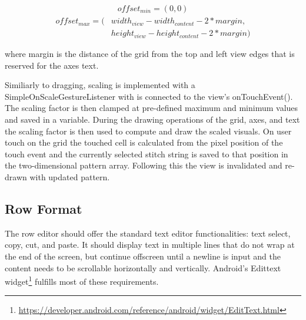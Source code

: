 \begin{gather*}
offset_{min} = (0, 0)
\end{gather*}
\begin{align*}
offset_{max} = (&width_{view} - width_{content} - 2 * margin, \\
				&height_{view} - height_{content} - 2 * margin)
\end{align*}

where margin is the distance of the grid from the top and left view edges that is reserved for the axes text.

Similiarly to dragging, scaling is implemented with a SimpleOnScaleGestureListener with is connected to the view's onTouchEvent(). The scaling factor is then clamped at pre-defined maximum and minimum values and saved in a variable. During the drawing operations of the grid, axes, and text the scaling factor is then used to compute and draw the scaled visuals. On user touch on the grid the touched cell is calculated from the pixel position of the touch event and the currently selected stitch string is saved to that position in the two-dimensional pattern array. Following this the view is invalidated and re-drawn with updated pattern.   

\subsection{Row Format}
\label{impl_row_format}
The row editor should offer the standard text editor functionalities: text select, copy, cut, and paste. It should display text in multiple lines that do not wrap at the end of the screen, but continue offscreen until a newline is input and the content needs to be scrollable horizontally and vertically. Android's Edittext widget\footnote{\url{https://developer.android.com/reference/android/widget/EditText.html}} fulfills most of these requirements. 

